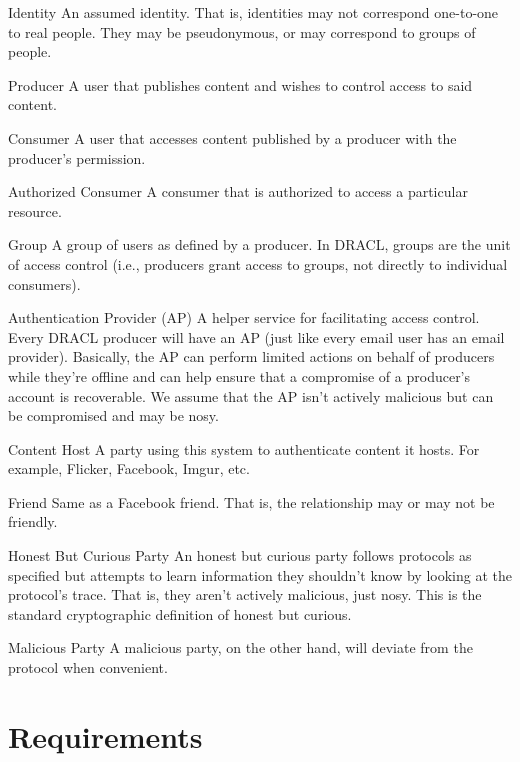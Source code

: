 \documentclass[pdftex,12pt,a4papaer,twoside,notitlepage]{report}
\begin{document}
\begin{compactdesc}
    \item[Identity] An assumed identity. That is, identities may not correspond
      one-to-one to real people. They may be pseudonymous, or may correspond to
      groups of people.
    \item[Producer] A user that publishes content and wishes to control
      access to said content.
    \item[Consumer] A user that accesses content published by a producer
      with the producer's permission.
    \item[Authorized Consumer] A consumer that is authorized to access a
      particular resource.
    \item[Group] A group of users as defined by a producer. In DRACL, groups
      are the unit of access control (i.e., producers grant access to groups,
      not directly to individual consumers).
    \item[Authentication Provider (AP)] A helper service for facilitating access
      control. Every DRACL producer will have an AP (just like every email user
      has an email provider). Basically, the AP can perform limited actions on
      behalf of producers while they're offline and can help ensure that a
      compromise of a producer's account is recoverable. We assume that the AP
      isn't actively malicious but can be compromised and may be nosy.
    \item[Content Host] A party using this system to authenticate content it
      hosts. For example, Flicker, Facebook, Imgur, etc.
    \item[Friend] Same as a Facebook friend. That is, the relationship may or
      may not be friendly.
    \item[Honest But Curious Party] An honest but curious party follows
      protocols as specified but attempts to learn information they shouldn't
      know by looking at the protocol's trace. That is, they aren't actively
      malicious, just nosy. This is the standard cryptographic definition of
      honest but curious.
    \item[Malicious Party] A malicious party, on the other hand, will deviate
      from the protocol when convenient.
\end{compactdesc}

\section{Requirements}
\end{document}

